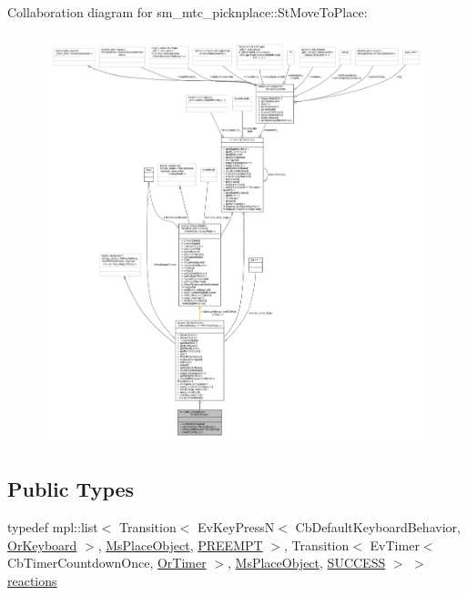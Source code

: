 Collaboration diagram for sm\+\_\+mtc\+\_\+picknplace\+:\+:St\+Move\+To\+Place\+:
\nopagebreak
\begin{figure}[H]
\begin{center}
\leavevmode
\includegraphics[width=350pt]{structsm__mtc__picknplace_1_1StMoveToPlace__coll__graph}
\end{center}
\end{figure}
\subsection*{Public Types}
\begin{DoxyCompactItemize}
\item 
typedef mpl\+::list$<$ Transition$<$ Ev\+Key\+PressN$<$ Cb\+Default\+Keyboard\+Behavior, \hyperlink{classsm__mtc__picknplace_1_1OrKeyboard}{Or\+Keyboard} $>$, \hyperlink{classsm__mtc__picknplace_1_1MsPlaceObject}{Ms\+Place\+Object}, \hyperlink{classPREEMPT}{P\+R\+E\+E\+M\+PT} $>$, Transition$<$ Ev\+Timer$<$ Cb\+Timer\+Countdown\+Once, \hyperlink{classsm__mtc__picknplace_1_1OrTimer}{Or\+Timer} $>$, \hyperlink{classsm__mtc__picknplace_1_1MsPlaceObject}{Ms\+Place\+Object}, \hyperlink{classSUCCESS}{S\+U\+C\+C\+E\+SS} $>$ $>$ \hyperlink{structsm__mtc__picknplace_1_1StMoveToPlace_a1fb980fed2ad4dafceeaf244b516690e}{reactions}
\end{DoxyCompactItemize}
